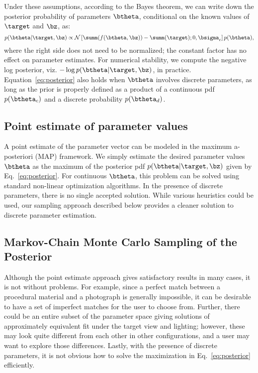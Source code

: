Under these assumptions, according to the Bayes theorem, we can write down the posterior probability of parameters $\btheta$, conditional on the known values of $\target$ and $\bz$, as:
%
\begin{equation} \label{eq:posterior}
p(\btheta | \target, \bz) \propto \mathcal{N}\left[\summ(f(\btheta, \bz)) - \summ(\target); 0, \bsigma_e\right] p(\btheta),
\end{equation}
%
where the right side does not need to be normalized; the constant factor has no effect on parameter estimates.
For numerical stability, we compute the negative log posterior, viz. $-\log p(\btheta | \target, \bz)$, in practice. Equation~\eqref{eq:posterior} also holds when $\btheta$ involves discrete parameters, as long as the prior is properly defined as a product of a continuous pdf $p(\btheta_c)$ and a discrete probability $p(\btheta_d)$.

\subsection{Point estimate of parameter values}

A point estimate of the parameter vector can be modeled in the maximum a-posteriori (MAP) framework. We simply estimate the desired parameter values $\btheta$ as the maximum of the posterior pdf $p(\btheta | \target, \bz)$ given by Eq.~\eqref{eq:posterior}. For continuous $\btheta$, this problem can be solved using standard non-linear optimization algorithms. In the presence of discrete parameters, there is no single accepted solution. While various heuristics could be used, our sampling approach described below provides a cleaner solution to discrete parameter estimation.



\subsection{Markov-Chain Monte Carlo Sampling of the Posterior}
\label{ssec:bayesian}
%
Although the point estimate approach gives satisfactory results in many cases, it is not without problems. For example, since a perfect match between a procedural material and a photograph is generally impossible, it can be desirable to have a set of imperfect matches for the user to choose from. Further, there could be an entire subset of the parameter space giving solutions of approximately equivalent fit under the target view and lighting; however, these may look quite different from each other in other configurations, and a user may want to explore those differences. Lastly, with the presence of discrete parameters, it is not obvious how to solve the maximization in Eq.~\eqref{eq:posterior} efficiently.

